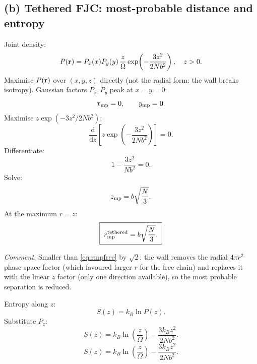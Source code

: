 \documentclass[11pt]{article}
\newcommand{\de}{\mathrm{d}}
\begin{document}
\subsection*{(b) Tethered FJC: most-probable distance and entropy}

Joint density:
\[ P(\vb r) = P_x(x)P_y(y)\,\frac{z}{\Omega}\exp\!\left(-\frac{3z^2}{2Nb^2}\right),\quad z>0. \]
Maximise $P(\vb r)$ over $(x,y,z)$ directly (not the radial form: the wall breaks isotropy). Gaussian factors $P_x,P_y$ peak at $x=y=0$:
\[ x_{\rm mp} = 0,\qquad y_{\rm mp}=0. \]
Maximise $z\exp(-3z^2/2Nb^2)$:
\[ \frac{\de}{\de z}\!\left[z\exp\!\left(-\frac{3z^2}{2Nb^2}\right)\right] = 0. \]
Differentiate:
\[ 1 - \frac{3z^2}{Nb^2} = 0. \]
Solve:
\[ z_{\rm mp} = b\sqrt{\frac{N}{3}}. \]
At the maximum $r=z$:
\begin{equation}
\boxed{\;r_{\rm mp}^{\rm tethered} = b\sqrt{\frac{N}{3}}.\;}
\label{eq:rmptether}
\end{equation}

\textit{Comment.} Smaller than \eqref{eq:rmpfree} by $\sqrt 2$: the wall removes the radial $4\pi r^2$ phase-space factor (which favoured larger $r$ for the free chain) and replaces it with the linear $z$ factor (only one direction available), so the most probable separation is reduced.

Entropy along $z$:
\[ S(z) = k_B\ln P(z). \]
Substitute $P_z$:
\[ S(z) = k_B\ln\!\left(\frac{z}{\Omega}\right) - \frac{3 k_B z^2}{2 N b^2}. \]
\begin{equation}
\boxed{\;S(z) = k_B\ln\!\left(\frac{z}{\Omega}\right) - \frac{3 k_B z^2}{2 N b^2}.\;}
\label{eq:Sz}
\end{equation}

\begin{center}
\end{center}
\end{document}
